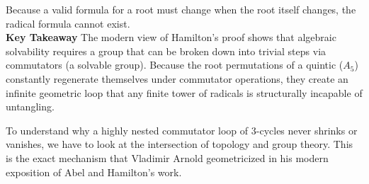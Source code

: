 Because a valid formula for a root must change when the root itself changes, the radical formula cannot exist. \\

{\bf Key Takeaway}
The modern view of Hamilton's proof shows that algebraic solvability requires a group that can be broken down into trivial steps via commutators (a solvable group). 
Because the root permutations of a quintic (\(A_{5}\)) constantly regenerate themselves under commutator operations, 
they create an infinite geometric loop that any finite tower of radicals is structurally incapable of untangling.


To understand why a highly nested commutator loop of 3-cycles never shrinks or vanishes, we have to look at the intersection of topology and group theory. 
This is the exact mechanism that Vladimir Arnold geometricized in his modern exposition of Abel and Hamilton's work.\\

